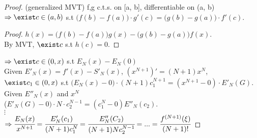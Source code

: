 \begin{proof}
    (generalized MVT) f,g c.t.s. on [a, b], differentiable on (a, b) $\Rightarrow \exist c \in (a, b)$ s.t $\big( f(b) - f(a) \big) \cdot g'(c) = \big( g(b) - g(a) \big) \cdot f'(c)$. \\
    \begin{proof}
        $h(x) = \big( f(b) -f(a) \big) g(x) - \big( g(b) -g(a) \big) f(x)$.  \\
        By MVT, $\exist c$ s.t $h(c)=0$.
    \end{proof}
    $\Rightarrow \exist c \in (0, x)$ s.t $E_N(x) - E_N (0)$ \\
    Given $E'_N (x) = f'(x) - S'_N (x)$, $(x^{N+1})' = (N+1)x^N$, $\exist c_1 \in (0, x)$ s.t $\big( E_N (x) - 0) \cdot (N+1) c_1^{N+1} = (x^{N+1} -0) \cdot E'_N (G)$. \\
    Given $E''_N (x) $ and $x^N$ \\
    ($E'_N (G) - 0) \cdot N \cdot c^{N-1}_2 = (c^N_1 - 0) E''_N (c_2).$ \\
    $\vdots$\\
    $\Rightarrow \cfrac{E_N (x) 
    }{x^{N+1}} = \cfrac{E'_N(c_1)}{(N+1)c^N_1}= \cfrac{E''_N(C_2)}{(N+1)N c^{N-1}_2} = ... = \cfrac{f^{(N+1)}(\xi)}{(N+1)!}$
\end{proof}
